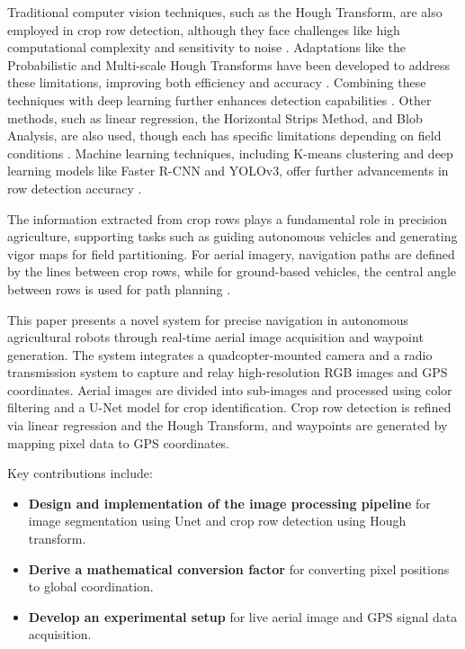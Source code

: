 \documentclass[conference]{IEEEtran}
\begin{document}
	Traditional computer vision techniques, such as the Hough Transform, are also employed in crop row detection, although they face challenges like high computational complexity and sensitivity to noise \cite{b2,b15}. Adaptations like the Probabilistic and Multi-scale Hough Transforms have been developed to address these limitations, improving both efficiency and accuracy \cite{b2}. Combining these techniques with deep learning further enhances detection capabilities \cite{b8}. Other methods, such as linear regression, the Horizontal Strips Method, and Blob Analysis, are also used, though each has specific limitations depending on field conditions \cite{b2,b3}. Machine learning techniques, including K-means clustering and deep learning models like Faster R-CNN and YOLOv3, offer further advancements in row detection accuracy \cite{b2,b5}.
	
	The information extracted from crop rows plays a fundamental role in precision agriculture, supporting tasks such as guiding autonomous vehicles and generating vigor maps for field partitioning. For aerial imagery, navigation paths are defined by the lines between crop rows, while for ground-based vehicles, the central angle between rows is used for path planning \cite{b11,b1}.
	
	
This paper presents a novel system for precise navigation in autonomous agricultural robots through real-time aerial image acquisition and waypoint generation. The system integrates a quadcopter-mounted camera and a radio transmission system to capture and relay high-resolution RGB images and GPS coordinates. Aerial images are divided into sub-images and processed using color filtering and a U-Net model for crop identification. Crop row detection is refined via linear regression and the Hough Transform, and waypoints are generated by mapping pixel data to GPS coordinates. 

Key contributions include: 

\begin{itemize}

	\item \textbf{Design and implementation of the image processing pipeline} for image segmentation using Unet and crop row detection using Hough transform.
	\item \textbf{Derive a mathematical conversion factor} for converting pixel positions to global coordination.
	\item \textbf{Develop an experimental setup} for live aerial image and GPS signal data acquisition.
\end{itemize}
\end{document}
